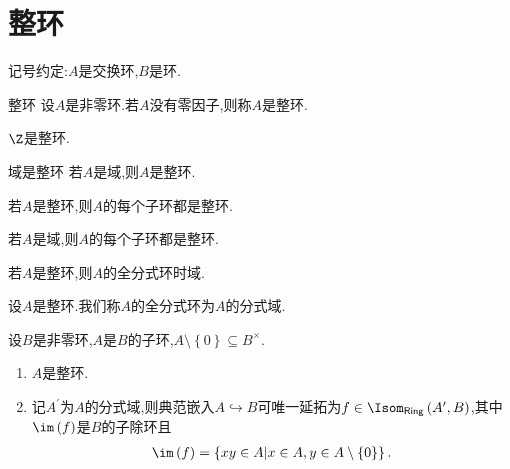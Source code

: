 \section{整环}

记号约定:$A$是交换环,$B$是环.

\begin{definition}{整环}{}
	设$A$是非零环.若$A$没有零因子,则称$A$是整环.
\end{definition}

\begin{example}{}{}
	$\Z$是整环.
\end{example}

\begin{proposition}{域是整环}{}
	若$A$是域,则$A$是整环.
\end{proposition}

\begin{proposition}{}{}
	若$A$是整环,则$A$的每个子环都是整环.
\end{proposition}

\begin{corollary}{}{}
	若$A$是域,则$A$的每个子环都是整环.
\end{corollary}

\begin{proposition}{}{}
	若$A$是整环,则$A$的全分式环时域.
\end{proposition}

\begin{definition}{}{}
	设$A$是整环.我们称$A$的全分式环为$A$的分式域.
\end{definition}

\begin{proposition}{}{}
	设$B$是非零环,$A$是$B$的子环,$A\setminus\left\{0\right\}\subseteq B^{\times}$.
	\begin{enumerate}
		\item $A$是整环.
		\item 记$A^{\prime}$为$A$的分式域,则典范嵌入$A\hookrightarrow B$可唯一延拓为$f\in\Isom_{\mathsf{Ring}}\left(A^{\prime},B\right)$,其中$\im\left(f\right)$是$B$的子除环且
		\begin{align*}
			\im\left(f\right)=\left\{xy\in A\middle|x\in A,y\in A\setminus\left\{0\right\}\right\}.
		\end{align*}
	\end{enumerate}
\end{proposition}













